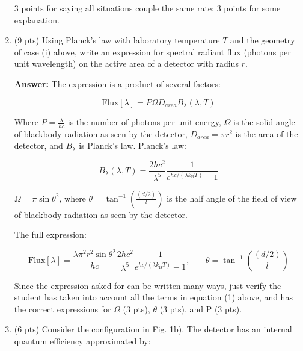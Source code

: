 \documentclass[12pt]{caltech_thesis}
\begin{document}
\begin{enumerate}
  {\color{darkred}  3 points for saying all situations couple the same
  rate; 3 points for some explanation. }
\item
  (9 pts) Using Planck's law with laboratory temperature \(T\) and the
  geometry of case (i) above, write an expression for spectral radiant
  flux (photons per unit wavelength) on the active area of a detector
  with radius \(r\).

  {\color{midnightblue}  \textbf{Answer:} } {\color{midnightblue} The
  expression is a product of several factors:}

  {\color{midnightblue} 

  \[\text{Flux}[\lambda] = P \Omega D_{area} B_{\lambda}(\lambda, T)\]

  }

  {\color{midnightblue}  Where \(P = \frac{\lambda}{hc}\) is the number
  of photons per unit energy, \(\Omega\) is the solid angle of blackbody
  radiation as seen by the detector, \(D_{area} = \pi r^2\) is the area
  of the detector, and \(B_{\lambda}\) is Planck's law. }
  {\color{midnightblue} Planck's law:}

  {\color{midnightblue} 

  \[B_{\lambda}(\lambda, T)=\frac{2 h c^{2}}{\lambda^{5}} \frac{1}{e^{h c /\left(\lambda k_{\mathrm{B}} T\right)}-1}\]

  }

  {\color{midnightblue}  \(\Omega = \pi \sin{\theta^2}\), where
  \(\theta = \tan^{-1}(\frac{(d/2)}{l})\) is the half angle of the field
  of view of blackbody radiation as seen by the detector. }

  {\color{midnightblue} The full expression: }

  {\color{midnightblue} 

  \[\text{Flux}[\lambda] = \frac{\lambda \pi^2 r^2 \sin{\theta^2}}{hc} \frac{2 h c^{2}}{\lambda^{5}} \frac{1}{e^{h c /\left(\lambda k_{\mathrm{B}} T\right)}-1}, \,\,\,\,\,\,\,\,\,\,\,\theta = \tan^{-1}(\frac{(d/2)}{l})\]

  }

  {\color{midnightblue}  Since the expression asked for can be written
  many ways, just verify the student has taken into account all the
  terms in equation (1) above, and has the correct expressions for}
  {\color{darkred} \(\Omega\) (3 pts), \(\theta\) (3 pts), and P (3
  pts).}
\item
  (6 pts) Consider the configuration in Fig. 1b). The detector has an
  internal quantum efficiency approximated by:


\end{enumerate}
\end{document}
